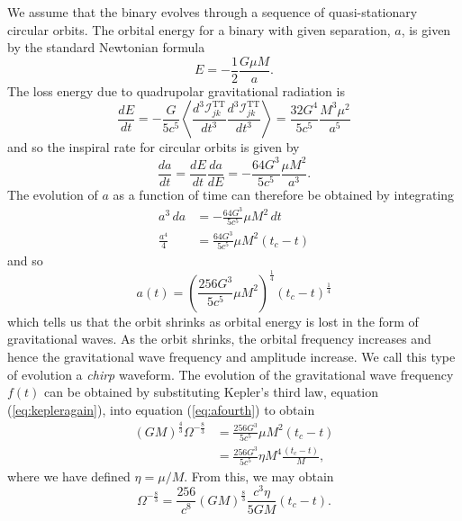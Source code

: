 We assume that the binary evolves through a sequence of quasi-stationary
circular orbits. The orbital energy for a binary with given separation, $a$,
is given by the standard Newtonian formula
\begin{equation}
E = -\frac{1}{2} \frac{G \mu M}{a}.
\end{equation}
The loss energy due to quadrupolar gravitational radiation is\cite{MTW73}
\begin{equation}
\frac{dE}{dt} = - \frac{G}{5c^5} \left\langle 
\frac{d^3 \mathcal{I}^\mathrm{TT}_{jk}}{dt^3}
\frac{d^3 \mathcal{I}^\mathrm{TT}_{jk}}{dt^3}
\right\rangle = \frac{32G^4}{5c^5} \frac{M^3 \mu^2}{a^5}
\end{equation}
and so the inspiral rate for circular orbits is given by
\begin{equation}
\frac{da}{dt} = \frac{dE}{dt}\frac{da}{dE} = - \frac{64G^3}{5c^5}\frac{\mu
M^2}{a^3}.
\end{equation}
The evolution of $a$ as a function of time can therefore be obtained by
integrating
\begin{align}
a^3 \, da &= - \frac{64G^3}{5c^5} \mu M^2 \, dt \\
\frac{a^4}{4} &= \frac{64G^3}{5c^5} \mu M^2 (t_c - t)
\label{eq:afourth}
\end{align}
and so
\begin{equation}
a(t) = \left(\frac{256G^3}{5c^5} \mu M^2 \right)^{\frac{1}{4}}
       \left(t_c - t\right)^{\frac{1}{4}}
\label{eq:aoft}
\end{equation}
which tells us that the orbit shrinks as orbital energy is lost in the form of
gravitational waves. As the orbit shrinks, the orbital frequency increases and
hence the gravitational wave frequency and amplitude increase. We call this
type of evolution a \emph{chirp} waveform.  The evolution of the gravitational
wave frequency $f(t)$ can be obtained by substituting Kepler's third law,
equation (\ref{eq:kepleragain}), into equation (\ref{eq:afourth}) to obtain
\begin{equation}
\begin{split}
\left(GM\right)^{\frac{4}{3}} \Omega^{-\frac{8}{3}} 
&= \frac{256G^3}{5c^5} \mu M^2 (t_c - t) \\
&= \frac{256G^3}{5c^5}\eta M^4 \frac{(t_c - t)}{M},
\end{split}
\end{equation}
where we have defined $\eta = \mu / M$. From this, we may obtain
\begin{equation}
\Omega^{-\frac{8}{3}} = 
\frac{256}{c^8} \left(GM\right)^\frac{8}{3} \frac{c^3 \eta}{5GM}(t_c - t).
\end{equation}

